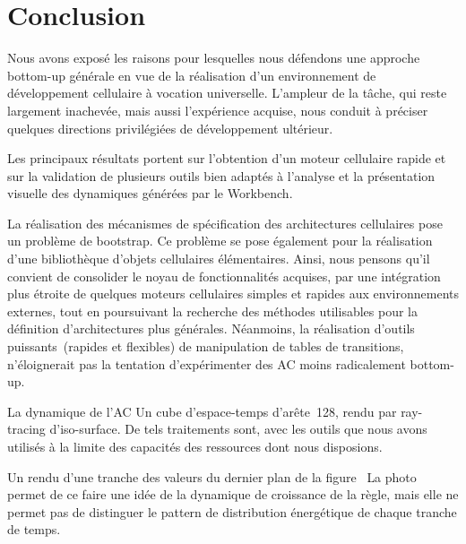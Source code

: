 \chapter{Conclusion}

Nous avons expos\'e les raisons pour lesquelles nous d\'efendons une
approche bottom-up g\'en\'erale en vue de la r\'ealisation d'un
environnement de d\'eveloppement cellulaire \`a vocation universelle. %
L'ampleur de la t\^ache, qui reste largement inachev\'ee, mais aussi
l'exp\'erience acquise, nous conduit \`a pr\'eciser quelques directions
privil\'egi\'ees de d\'eveloppement ult\'erieur.

Les principaux r\'esultats portent sur l'obtention d'un moteur
cellulaire rapide et sur la validation de plusieurs outils bien
adapt\'es \`a l'analyse et la pr\'esentation visuelle des dynamiques
g\'en\'er\'ees par le Workbench.

La r\'ealisation des m\'ecanismes de sp\'ecification des architectures
cellulaires pose un probl\`eme de bootstrap. %
Ce probl\`eme se pose \'egalement pour la r\'ealisation d'une biblioth\`eque
d'objets cellulaires \'el\'ementaires. %
Ainsi, nous pensons qu'il convient de consolider le noyau de
fonctionnalit\'es acquises, par une int\'egration plus \'etroite de quelques
moteurs cellulaires simples et rapides aux environnements externes,
tout en poursuivant la recherche des m\'ethodes utilisables pour la
d\'efinition d'architectures plus g\'en\'erales. %
N\'eanmoins, la r\'ealisation d'outils puissants~(rapides et flexibles) de
manipulation de tables de transitions, n'\'eloignerait pas la tentation
d'exp\'erimenter des AC moins radicalement bottom-up.


%
{}
{La dynamique de l'AC }%
{Un cube d'espace-temps d'ar\^ete~128, rendu par ray-tracing
  d'iso-sur\-face. %
  De tels traitements sont, avec les outils que nous avons utilis\'es \`a
  la limite des capacit\'es des ressources dont nous disposions.}

%
{}%
{Un rendu d'une tranche des valeurs du dernier
  plan de la figure~\protect{}}%
{La photo~ permet de ce faire une id\'ee de la
  dynamique de croissance de la r\`egle, mais elle ne permet pas de
  distinguer le pattern de distribution \'energ\'etique de chaque tranche
  de temps.}

